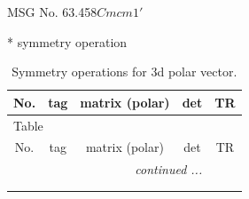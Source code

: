 \documentclass[fleqn,8pt]{jsarticle}
\begin{document}
\setcounter{MaxMatrixCols}{32}

\renewcommand{\tablename}{Table~}
\renewcommand{\figurename}{Figure~}
\begin{center}
\LARGE
MSG No. 63.458\quad$Cmcm1'$
\end{center}
* symmetry operation
\renewcommand{\arraystretch}{1.3}
\begin{longtable}{ccccc}
\caption{Symmetry operations for 3d polar vector.}
 \\
 \hline \hline
No. & tag & matrix (polar) & det & TR \\ \hline \endfirsthead

\multicolumn{4}{l}{\tablename\ \thetable{}} \\
 \hline \hline
No. & tag & matrix (polar) & det & TR \\ \hline \endhead

 \hline \hline
\multicolumn{4}{r}{\footnotesize\it continued ...} \\ \endfoot

 \hline \hline
\multicolumn{4}{r}{} \\ \endlastfoot


\end{longtable}
\end{document}
